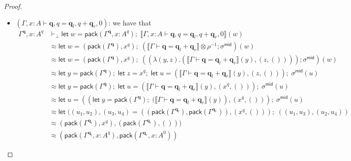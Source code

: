 \documentclass[acmsmall,screen,review]{acmart}
\newcommand{\mb}[1]{\ensuremath{\mathbf{#1}}}
\newcommand{\ms}[1]{\ensuremath{\mathsf{#1}}}
\newcommand{\letexpr}[3]{\ensuremath{\ms{let}\;#1 = #2;\;#3}}
\newcommand{\qsp}[4]{#1 \vdash #2 = #3 + #4}
\newcommand{\dnt}[1]{\llbracket{#1}\rrbracket}
\begin{document}
\begin{proof}
\begin{itemize}
\begin{align*}
        \letexpr{x}{\ms{pack}(\cdot)}{\dnt{\qsp{\cdot}{\cdot}{\cdot}{\cdot}}(x)} 
        \approx \letexpr{x}{()}{\rho^{-1}(x)} \\
        &\approx \letexpr{x}{()}{(x, ())}
        \approx ((), ())
        \approx (\ms{pack}(\cdot), \ms{pack}(\cdot))
        : [\ms{pack}(\cdot)] \otimes [\ms{pack}(\cdot)]
    \end{align*}
    as desired.
    \item $(\qsp{\Gamma, x : A}{\mb{q}, q}{\mb{q}_l, q}{\mb{q}_r, 0})$: we have that
    \begin{align*}
      \Gamma^{\mb{q}}, x : A^q &\vdash_\bot
        \letexpr{w}{\ms{pack}(\Gamma^{\mb{q}}, x : A^q)}
          {\dnt{\qsp{\Gamma, x : A}{\mb{q}, q}{\mb{q}_l, q}{\mb{q}_r, 0}}(w)} \\
        &\approx
        \letexpr{w}{(\ms{pack}(\Gamma^{\mb{q}}), x^q)}{
          (\dnt{\qsp{\Gamma}{\mb{q}}{\mb{q}_l}{\mb{q}_r}} \otimes \rho^{-1} ; \sigma^{\ms{mid}})(w)
        } \\
        &\approx
        \letexpr{w}{(\ms{pack}(\Gamma^{\mb{q}}), x^q)}{
          ((\lambda (y, z) . (\dnt{\qsp{\Gamma}{\mb{q}}{\mb{q}_l}{\mb{q}_r}}(y), (z, ()))) 
            ; \sigma^{\ms{mid}})(w)
        } \\
        &\approx
        \letexpr{y}{\ms{pack}(\Gamma^{\mb{q}})}{
          \letexpr{z}{x^q}{
            \letexpr{u}{(\dnt{\qsp{\Gamma}{\mb{q}}{\mb{q}_l}{\mb{q}_r}}(y), (z, ()))}
              {\sigma^{\ms{mid}}(u)}
          }
        }
        \\
        &\approx
        \letexpr{y}{\ms{pack}(\Gamma^{\mb{q}})}{
          \letexpr{u}{(\dnt{\qsp{\Gamma}{\mb{q}}{\mb{q}_l}{\mb{q}_r}}(y), (x^q, ()))}
            {\sigma^{\ms{mid}}(u)}
        }
        \\
        &\approx
        \letexpr{u}{
          ((\letexpr{y}{\ms{pack}(\Gamma^{\mb{q}})}
            {(\dnt{\qsp{\Gamma}{\mb{q}}{\mb{q}_l}{\mb{q}_r}}(y)}), (x^q, ()))
          }
          {\sigma^{\ms{mid}}(u)}
        \\
        &\approx
        \letexpr{((u_1, u_2), (u_3, u_4)}{
          ((\ms{pack}(\Gamma^{\mb{q}_l}), \ms{pack}(\Gamma^{\mb{q}_r})), (x^q, ()))
          }
          {((u_1, u_3), (u_2, u_4))}
        \\
        &\approx
          (\ms{pack}(\Gamma^{\mb{q}_l}), x^q), (\ms{pack}(\Gamma^{\mb{q}_r}), ()))
        \\
        &\approx
          (\ms{pack}(\Gamma^{\mb{q}_l}, x : A^q), \ms{pack}(\Gamma^{\mb{q}_r}, x : A^0))

\end{align*}
\end{itemize}
\end{proof}
\end{document}

